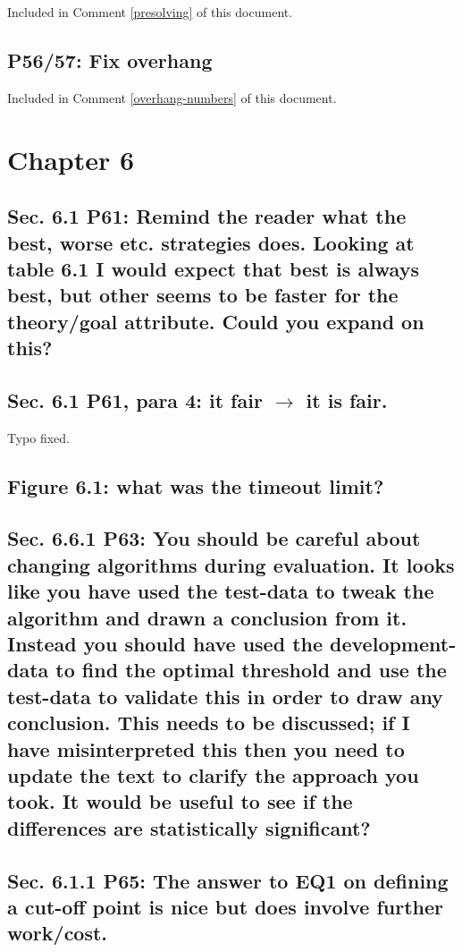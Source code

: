 \documentclass[]{article}
\begin{document}
Included in Comment \ref{presolving} of this document.

\subsection{P56/57: Fix overhang}

Included in Comment \ref{overhang-numbers} of this document.

\section{Chapter 6}

\subsection{Sec. 6.1 P61: Remind the reader what the best, worse etc. strategies does. Looking at table 6.1 I would expect that best is always best, but other seems to be faster for the theory/goal attribute. Could you expand on this?}

\subsection{Sec. 6.1 P61, para 4: it fair $\rightarrow$ it is fair.}

Typo fixed.

\subsection{Figure 6.1: what was the timeout limit?}

\subsection{Sec. 6.6.1 P63: You should be careful about changing algorithms during evaluation. It looks like you have used the test-data to tweak the algorithm and drawn a conclusion from it. Instead you should have used the development-data to find the optimal threshold and use the test-data to validate this in order to draw any conclusion. This needs to be discussed; if I have	misinterpreted this then you need to update the text to clarify the approach you took. It would be useful to see if the differences are statistically significant?}

\subsection{Sec. 6.1.1 P65: The answer to EQ1 on defining a cut-off point is nice but does involve further work/cost.}
\end{document}
